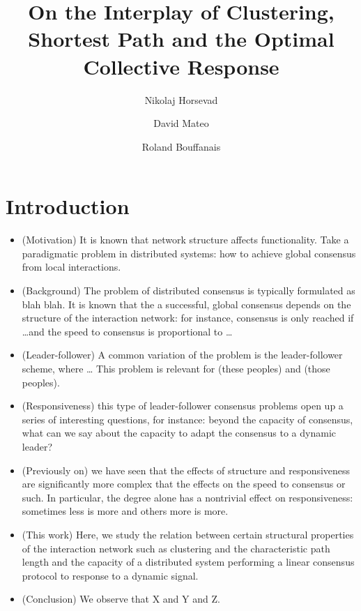 \documentclass[fleqn,10pt]{wlscirep}
\title{On the Interplay of Clustering, Shortest Path and the Optimal Collective Response}
\author[1,*]{Nikolaj Horsevad}
\author[2,+]{David Mateo}
\author[1,+]{Roland Bouffanais}
\affil[1]{Affiliation, department, city, postcode, country}
\affil[2]{Affiliation, department, city, postcode, country}
\affil[*]{nikolajhorsevad@gmail.com}
\affil[+]{these authors contributed equally to this work}
\begin{document}
\flushbottom
\maketitle
%
%
\thispagestyle{empty}


\section*{Introduction}

\begin{itemize}
    \item (Motivation) It is known that network structure affects functionality.
    Take a paradigmatic problem in distributed systems: how to achieve global consensus from local interactions.
    \item (Background) The problem of distributed consensus is typically formulated as blah blah.
    It is known that the a successful, global consensus depends on the structure of the interaction network: for instance, consensus is only reached if \ldots and the speed to consensus is proportional to \ldots
    \item (Leader-follower) A common variation of the problem is the leader-follower scheme, where \ldots
    This problem is relevant for (these peoples) and (those peoples).
    \item (Responsiveness) this type of leader-follower consensus problems open up a series of interesting questions, for instance: beyond the capacity of consensus, what can we say about the capacity to adapt the consensus to a dynamic leader?
    \item (Previously on) we have seen that the effects of structure and responsiveness are significantly more complex that the effects on the speed to consensus or such.
    In particular, the degree alone has a nontrivial effect on responsiveness: sometimes less is more and others more is more.
    \item (This work) Here, we study the relation between certain structural properties of the interaction network such as clustering and the characteristic path length and the capacity of a distributed system performing a linear consensus protocol to response to a dynamic signal.
    \item (Conclusion) We observe that X and Y and Z.

\end{itemize}
\end{document}
